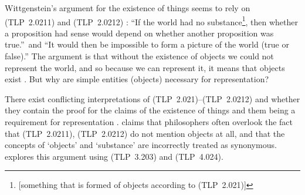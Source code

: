 \documentclass{article}
\newcommand{\prop}[1]{(TLP~#1)}
\begin{document}
Wittgenstein's argument for the existence of things seems to rely on \prop{2.0211} and \prop{2.0212} \cite{Sp2007}: ``If the world had no substance\footnote{[something that is formed of objects according to \prop{2.021}]}, then whether a proposition had sense would depend on whether another proposition was true.''\ and ``It would then be impossible to form a picture of the world (true or false).''
The argument is that without the existence of objects we could not represent the world, and so because we can represent it, it means that objects exist \cite{Sp2007}.
But why are simple entities (objects) necessary for representation?

There exist conflicting interpretations of \prop{2.021}--\prop{2.0212} and whether they contain the proof for the claims of the existence of things and them being a requirement for representation \cite{Lu1976, Gr1964, We1935, An1959, Pi1964}. 
\cite{Lu1976} claims that philosophers often overlook the fact that \prop{2.0211}, \prop{2.0212} do not mention objects at all, and that the concepts of `objects' and `substance' are incorrectly treated as synonymous.
\cite{Sp2007} explores this argument using \prop{3.203} and \prop{4.024}.

\printbibliography[title=References]
\end{document}

